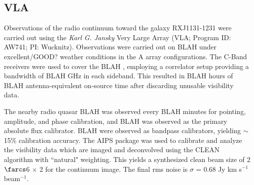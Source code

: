 \documentclass[]{emulateapj}
\begin{document}
\subsection{VLA} 

Observations of the radio continuum toward the
galaxy RXJ1131-1231 were carried out using the {\it Karl G. Jansky} Very Large 
Array (VLA; Program ID: AW741; PI: Wucknitz).
Observations were carried out on BLAH under excellent/GOOD? weather
conditions in the A array configurations. The C-Band receivers were used to 
cover the BLAH
, employing a correlator setup providing a bandwidth of BLAH GHz in each
sideband. This resulted in BLAH hours of BLAH antenna-equivalent on-source time
after 
discarding unusable visibility data.

The nearby radio quasar BLAH was observed every BLAH minutes for
pointing, amplitude, and phase calibration, and BLAH was observed as the
primary
absolute flux calibrator. BLAH were observed as bandpass calibrators, yielding
$\sim
$15\% calibration accuracy.
The AIPS package was used to calibrate and analyze the visibility data which
are imaged and deconvolved using
the CLEAN algorithm with ``natural" weighting. This yields a synthesized clean
beam size of 2$\farcs$6 $\times$ 2 for the continuum image. The final
rms 
noise is $\sigma$ = 0.68 Jy km s$^{-1}$ beam$^{-1}$.
\end{document}
